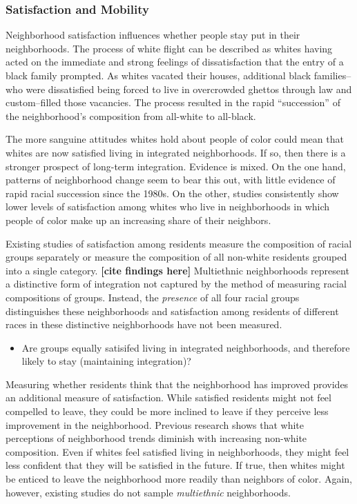 \documentclass{baderart}
\providecommand{\tightlist}{%
  \setlength{\itemsep}{0pt}\setlength{\parskip}{0pt}}
\begin{document}
\subsubsection{Satisfaction and
Mobility}\label{satisfaction-and-mobility}

Neighborhood satisfaction influences whether people stay put in their
neighborhoods. The process of white flight can be described as whites
having acted on the immediate and strong feelings of dissatisfaction
that the entry of a black family prompted. As whites vacated their
houses, additional black families--who were dissatisfied being forced to
live in overcrowded ghettos through law and custom--filled those
vacancies. The process resulted in the rapid ``succession'' of the
neighborhood's composition from all-white to all-black.

The more sanguine attitudes whites hold about people of color could mean
that whites are now satisfied living in integrated neighborhoods. If so,
then there is a stronger prospect of long-term integration. Evidence is
mixed. On the one hand, patterns of neighborhood change seem to bear
this out, with little evidence of rapid racial succession since the
1980s. On the other, studies consistently show lower levels of
satisfaction among whites who live in neighborhoods in which people of
color make up an increasing share of their neighbors.

Existing studies of satisfaction among residents measure the composition
of racial groups separately or measure the composition of all non-white
residents grouped into a single category. \textbf{{[}cite findings
here{]}} Multiethnic neighborhoods represent a distinctive form of
integration not captured by the method of measuring racial compositions
of groups. Instead, the \emph{presence} of all four racial groups
distinguishes these neighborhoods and satisfaction among residents of
different races in these distinctive neighborhoods have not been
measured.

\begin{itemize}
\tightlist
\item
  Are groups equally satisifed living in integrated neighborhoods, and
  therefore likely to stay (maintaining integration)?
\end{itemize}

Measuring whether residents think that the neighborhood has improved
provides an additional measure of satisfaction. While satisfied
residents might not feel compelled to leave, they could be more inclined
to leave if they perceive less improvement in the neighborhood. Previous
research shows that white perceptions of neighborhood trends diminish
with increasing non-white composition. Even if whites feel satisfied
living in neighborhoods, they might feel less confident that they will
be satisfied in the future. If true, then whites might be enticed to
leave the neighborhood more readily than neighbors of color. Again,
however, existing studies do not sample \emph{multiethnic}
neighborhoods.
\end{document}
